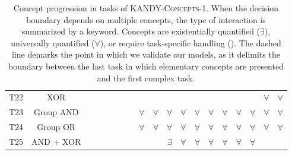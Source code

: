\begin{table}[h]
{\begin{tabular}{cc|ccc:ccc:ccc:cccccccc}
			T22  & XOR             &     &      &     &      &      &      &      &      &      &     &      &      &      &      &      & $\forall$     &  $\forall$    \\
			T23  &   Group AND          &     &      &     &      &      &      & $\forall$     & $\forall$     & $\forall$     &  $\forall$   & $\forall$     &  $\forall$    & $\forall$     & $\forall$     & $\forall$     & $\forall$     & $\forall$     \\
			T24  &   Group OR          &     &      &     &      &      &      & $\forall$     & $\forall$     & $\forall$     &  $\forall$   & $\forall$     &  $\forall$    & $\forall$     & $\forall$     & $\forall$     & $\forall$     & $\forall$     \\
			T25  & AND + XOR            &     &      &     &      &      &      &      &      &  $\exists$    & $\forall$    & $\forall$     & $\forall$     & $\forall$     & $\forall$     & $\forall$     &      &      \\
			\bottomrule
		\end{tabular}
	}
	\caption[\textsc{KANDY-Concepts-2} curriculum]{Concept progression in tasks of \textsc{KANDY-Concepts-1}. When the decision boundary depends on multiple concepts, the type of interaction is summarized by a keyword. Concepts are existentially quantified ($\exists$), universally quantified ($\forall$), or require task-specific handling (\cmark). The dashed line demarks the point in which we validate our models, as it delimits the boundary between the last task in which elementary concepts are presented and the first complex task.}
	\label{cem:tab:kandy_2interactions}
\end{table}
